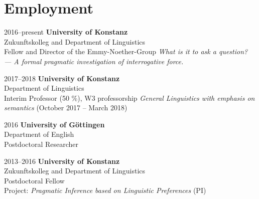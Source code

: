 \section*{Employment}
\begin{dated}
	\item[2016--present] 
		\textbf{University of Konstanz}\\
		Zukunftskolleg and Department of Linguistics\\
		Fellow and Director of the Emmy-Noether-Group \textit{What is it to ask a question? --- A formal pragmatic investigation of interrogative force.}
	\item[2017--2018] 
		\textbf{University of Konstanz}\\
		Department of Linguistics\\
		Interim Professor (50 \%), W3 professorship \textit{General Linguistics with emphasis on semantics} (October 2017 -- March 2018)
	\item[2016]
		\textbf{University of G\"ottingen}\\
		Department of English\\
		Postdoctoral Researcher
	\item[2013--2016]
		\textbf{University of Konstanz}\\
		{Zukunftskolleg and Department of Linguistics}\\
		Postdoctoral Fellow\\
		Project: \textit{Pragmatic Inference based on Linguistic Preferences} (PI)
\end{dated}